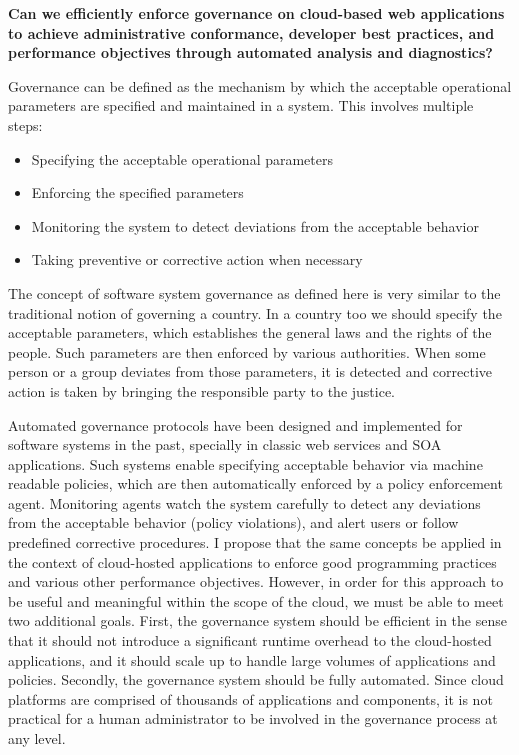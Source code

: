 {\bf Can we efficiently enforce governance on cloud-based web applications to achieve 
administrative conformance, developer best practices, and performance objectives through 
automated analysis and diagnostics?} 

Governance can be defined as the mechanism by which the acceptable operational parameters 
are specified and maintained in a system. This involves multiple steps:
\begin{itemize}
\item Specifying the acceptable operational parameters
\item Enforcing the specified parameters
\item Monitoring the system to detect deviations from the acceptable behavior
\item Taking preventive or corrective action when necessary
\end{itemize}

The concept of software system governance as defined here is very similar to the traditional 
notion of governing a country. In a country too we should specify the acceptable
parameters, which establishes the general laws and the rights of the people. Such 
parameters are then
enforced by various authorities. When some person or a group deviates from those parameters,
it is detected and corrective action is taken by bringing the responsible party to the justice.

Automated governance protocols have been designed and implemented for software systems in
the past, specially in classic web services and SOA applications. Such systems enable specifying
acceptable behavior via machine readable policies, which are then automatically enforced by
a policy enforcement agent. Monitoring agents watch the system carefully to detect any deviations from
the acceptable behavior (policy violations), and alert users or follow predefined corrective
procedures. I propose that the same
concepts be applied in the context of cloud-hosted applications to enforce good programming
practices and various other performance objectives. However, in order for this approach to be
useful and meaningful within the scope of the cloud, we must be able to meet two additional
goals. First, the governance system should be efficient in the sense that it should not introduce
a significant runtime overhead to the cloud-hosted applications, and it should scale up to
handle large volumes of applications and policies. Secondly, the governance system should be
fully automated. Since cloud platforms are comprised of thousands of applications and components,
it is not practical for a human administrator to be involved in the governance process at any level.


